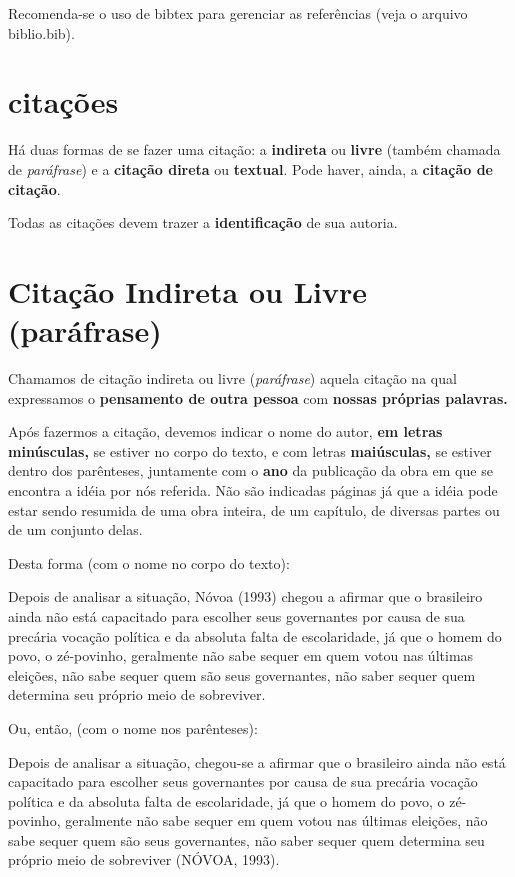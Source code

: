 \documentclass[rel_mlp]{iiufrgs}
\begin{document}
 
 
Recomenda-se o uso de bibtex para gerenciar as referências (veja o arquivo
biblio.bib).



\section{citações}

Há duas formas de se fazer uma citação: a {\bf indireta} ou {\bf livre} (também chamada de {\it paráfrase}) e a {\bf citação direta} ou {\bf textual}. Pode haver, ainda, a {\bf citação de citação}.

Todas as citações devem trazer a {\bf identificação }de sua autoria.


\section{Citação Indireta ou Livre (paráfrase)}

Chamamos de citação indireta ou livre ({\it paráfrase}) aquela citação na qual expressamos o {\bf pensamento de outra pessoa }com {\bf nossas próprias palavras.}

Após fazermos a citação, devemos indicar o nome do autor, {\bf em letras minúsculas, }se estiver no corpo do texto, e com letras {\bf maiúsculas, }se estiver dentro dos parênteses, juntamente com o {\bf ano }da publicação da obra em que se encontra a idéia por nós referida. Não são indicadas páginas já que a idéia pode estar sendo resumida de uma obra inteira, de um capítulo, de diversas partes ou de um conjunto delas.

Desta forma (com o nome no corpo do texto):

Depois de analisar a situação, Nóvoa (1993) chegou a afirmar que o brasileiro ainda não está capacitado para escolher seus governantes por causa de sua precária vocação política e da absoluta falta de escolaridade, já que o homem do povo, o zé-povinho, geralmente não sabe sequer em quem votou nas últimas eleições, não sabe sequer quem são seus governantes, não saber sequer quem determina seu próprio meio de sobreviver.

Ou, então, (com o nome nos parênteses):

Depois de analisar a situação, chegou-se a afirmar que o brasileiro ainda não está capacitado para escolher seus governantes por causa de sua precária vocação política e da absoluta falta de escolaridade, já que o homem do povo, o zé-povinho, geralmente não sabe sequer em quem votou nas últimas eleições, não sabe sequer quem são seus governantes, não saber sequer quem determina seu próprio meio de sobreviver (NÓVOA, 1993).
\end{document}
